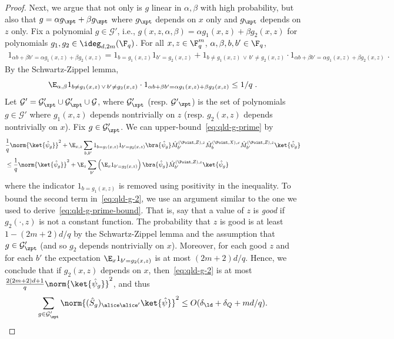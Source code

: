 \begin{proof}
	Next, we argue that not only is $g$ linear in $\alpha, \beta$
        with high probability, but also that $g = \alpha g_\xpt +
        \beta g_\zpt$ where $g_\xpt$ depends on $x$ only and $g_\zpt$
        depends on $z$ only. Fix a polynomial $g \in \mathcal{G}'$,
        i.e., $g(x,z,\alpha,\beta) = \alpha g_1(x,z) + \beta g_2(x,z)$
        for polynomials $g_1, g_2 \in \ideg_{d,2m}(\F_q)$. For all $x,z \in \F_q^m$, $\alpha, \beta, b,b' \in \F_q$,
	\begin{align*}
		1_{\alpha b + \beta b' = \alpha g_1(x,z) + \beta g_2(x,z)}
		= 1_{b = g_1(x,z)} 1_{b' = g_2(x,z)} + 1_{b \neq g_1(x,z) \, \vee \, b' \neq g_2(x,z)} \cdot 1_{\alpha b + \beta b' = \alpha g_1(x,z) + \beta g_2(x,z)}\;.
	\end{align*}
	By the Schwartz-Zippel lemma,  
	\begin{equation}
	\label{eq:qld-g-separable}
	\E_{\alpha, \beta} 1_{b \neq g_1(x,z) \, \vee \, b' \neq g_2(x,z)} \cdot 1_{\alpha b + \beta b' = \alpha g_1(x,z) + \beta g_2(x,z)} \leq 1/q\;.
	\end{equation}
	Let $\mathcal{G}' = \mathcal{G}'_\xpt \cup \mathcal{G}'_\zpt \cup \mathcal{G}$, where $\mathcal{G}'_\xpt$ (resp. $\mathcal{G'}_\zpt$) is the set of polynomials $g \in \mathcal{G}'$ where $g_1(x,z)$ depends nontrivially on $z$ (resp. $g_2(x,z)$ depends nontrivially on $x$). Fix $g \in \mathcal{G}'_\zpt$. We can upper-bound~\eqref{eq:qld-g-prime} by
	\begin{align}
		&\frac{1}{q} \norm{ \ket{\hat{\psi}_g}}^2 + \E_{x,z} \sum_{b,b'} 1_{b = g_1(x,z)} 1_{b' = g_2(x,z)} \bra{\hat{\psi}_g}   \hat{M}^{(\Point,Z),z}_{b'} \hat{M}^{(\Point,X),x}_{b} \hat{M}^{(\Point,Z),z}_{b'}  \ket{\hat{\psi}_g} \label{eq:qld-g-48} \\
		&\leq \frac{1}{q} \norm{ \ket{\hat{\psi}_g}}^2 + \E_{z} \sum_{b'} \Big(\E_x 1_{b' = g_2(x,z)} \Big) \, \bra{\hat{\psi}_g}  \hat{M}^{(\Point,Z),z}_{b'}  \ket{\hat{\psi}_g}
		\label{eq:qld-g-2}
\end{align}
	where the indicator $1_{b = g_1(x,z)}$ is removed using
        positivity in the inequality. To bound the second term
      in~\eqref{eq:qld-g-2}, we use an argument similar to the one we used to
      derive~\eqref{eq:qld-g-prime-bound}. That is, say that a value
      of $z$ is \emph{good} if $g_2(\cdot ,z)$ is not a constant
      function. The probability that $z$ is good is at least $1 -
      (2m+2)d/q$ by the Schwartz-Zippel lemma and the assumption that $g \in \mathcal{G}'_{\zpt}$ (and so $g_2$ depends nontrivially on $x$). Moreover, for each good $z$ and
      for each $b'$ the expectation $\E_x 1_{b' = g_2(x,z)}$ is at
      most $(2m+2)d/q$. Hence, we conclude that if $g_2(x,z)$ depends on $x$, then~\eqref{eq:qld-g-2} is at most $ \frac{2(2m+2)d + 1}{q} \norm {\ket{\hat{\psi}_g}}^2$, and thus 
	\begin{equation}
	\label{eq:qld-g-prime-xpt-bound}
		\sum_{g \in \mathcal{G}'_\zpt} \norm{ (\hat{S}_g)_{\alice \alice'} \ket{\hat{\psi}}}^2 \leq O(\delta_\ld + \delta_Q + md/q).
	\end{equation}	
	

\end{proof}
